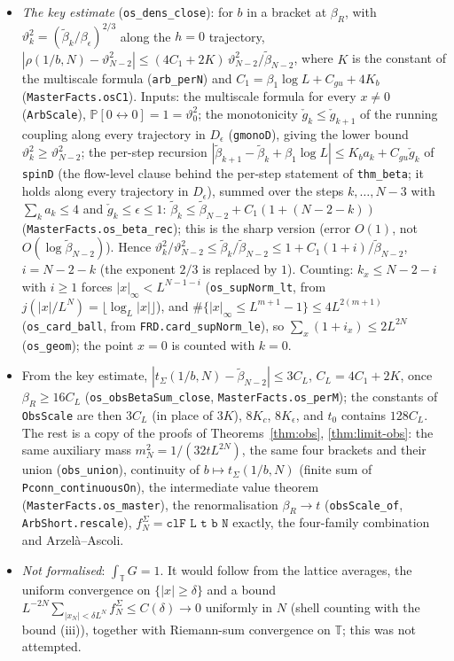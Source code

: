 \documentclass[11pt]{amsart}
\theoremstyle{definition}
\theoremstyle{remark}
\numberwithin{equation}{section}
\newcommand{\T}{\mathbb{T}}
\newcommand{\conn}{\leftrightarrow}
\begin{document}
\begin{itemize}
\item \emph{The key estimate} (\texttt{os\_dens\_close}): for $b$ in a bracket at $\beta_R$, with
$\vartheta_k^2=(\tilde\beta_k/\beta_\epsilon)^{2/3}$ along the $h=0$ trajectory,
$|\rho(1/b,N)-\vartheta_{N-2}^2|\le(4C_1+2K)\,\vartheta_{N-2}^2/\tilde\beta_{N-2}$, where $K$ is the constant of the
multiscale formula (\texttt{arb\_perN}) and $C_1=\beta_1\log L+C_{gu}+4K_b$ (\texttt{MasterFacts.osC1}). Inputs: the
multiscale formula for every $x\ne0$ (\texttt{ArbScale}), $\mathbb{P}[0\conn0]=1=\vartheta_0^2$; the monotonicity
$\check g_k\le\check g_{k+1}$ of the running coupling along every trajectory in $D_\epsilon$ (\texttt{gmonoD}), giving the
lower bound $\vartheta_k^2\ge\vartheta_{N-2}^2$; the per-step recursion
$|\tilde\beta_{k+1}-\tilde\beta_k+\beta_1\log L|\le K_b a_k+C_{gu}\check g_k$ of \texttt{spinD} (the flow-level clause
behind the per-step statement of \texttt{thm\_beta}; it holds along every trajectory in $D_\epsilon$), summed over the
steps $k,\dots,N-3$ with $\sum_ka_k\le4$ and $\check g_k\le\epsilon\le1$:
$\tilde\beta_k\le\tilde\beta_{N-2}+C_1(1+(N-2-k))$ (\texttt{MasterFacts.os\_beta\_rec}); this is the sharp
version (error $O(1)$, not $O(\log\tilde\beta_{N-2})$). Hence
$\vartheta_k^2/\vartheta_{N-2}^2\le\tilde\beta_k/\tilde\beta_{N-2}\le1+C_1(1+i)/\tilde\beta_{N-2}$, $i=N-2-k$ (the
exponent $2/3$ is replaced by $1$). Counting: $k_x\le N-2-i$ with $i\ge1$ forces $|x|_\infty<L^{N-1-i}$
(\texttt{os\_supNorm\_lt}, from $j(|x|/L^N)=\lfloor\log_L|x|\rfloor$), and
$\#\{|x|_\infty\le L^{m+1}-1\}\le4L^{2(m+1)}$ (\texttt{os\_card\_ball}, from \texttt{FRD.card\_supNorm\_le}), so
$\sum_x(1+i_x)\le2L^{2N}$ (\texttt{os\_geom}); the point $x=0$ is counted with $k=0$.
\item From the key estimate, $|t_\Sigma(1/b,N)-\tilde\beta_{N-2}|\le3C_L$, $C_L=4C_1+2K$, once $\beta_R\ge16C_L$
(\texttt{os\_obsBetaSum\_close}, \texttt{MasterFacts.os\_perM}); the constants of \texttt{ObsScale} are then
$3C_L$ (in place of $3K$), $8K_c$, $8K_\epsilon$, and $t_0$ contains $128C_L$. The rest is a copy of the proofs of
Theorems~\ref{thm:obs}, \ref{thm:limit-obs}: the same auxiliary mass $m_N^2=1/(32tL^{2N})$, the same four brackets and
their union (\texttt{obs\_union}), continuity of $b\mapsto t_\Sigma(1/b,N)$ (finite sum of
\texttt{Pconn\_continuousOn}), the intermediate value theorem (\texttt{MasterFacts.os\_master}), the renormalisation
$\beta_R\to t$ (\texttt{obsScale\_of}, \texttt{ArbShort.rescale}), $f^\Sigma_N=\texttt{clF L t b N}$ exactly, the
four-family combination and Arzel\`a--Ascoli.
\item \emph{Not formalised}: $\int_\T G=1$. It would follow from the lattice averages, the uniform convergence on
$\{|x|\ge\delta\}$ and a bound $L^{-2N}\sum_{|x_N|<\delta L^N}f^\Sigma_N\le C(\delta)\to0$ uniformly in $N$ (shell
counting with the bound (iii)), together with Riemann-sum convergence on $\T$; this was not attempted.
\end{itemize}
\end{document}
